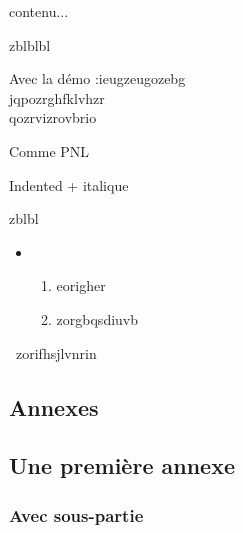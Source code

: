 \begin{lemme}
	contenu...
\end{lemme}


\begin{theoreme}
	zblblbl
\end{theoreme}


\begin{corollaire}
	Avec la démo :ieugzeugozebg \\
	jqpozrghfklvhzr \\ 
	qozrvizrovbrio
\end{corollaire}

\begin{demo}
Comme PNL
\end{demo}



\begin{remarque}
	Indented + italique
\end{remarque}



\begin{exercice}
	zblbl
	\begin{itemize}
		\item \begin{enumerate}
			\item eorigher
			\item zorgbqsdiuvb
		\end{enumerate}
	\end{itemize}
	\textperiodcentered\ zorifhsjlvnrin
\end{exercice}


\begin{annexe}
	\section{Annexes}

	\subsection{Une première annexe}
	
	\subsubsection{Avec sous-partie}
\end{annexe}



\newpage

\listoffigures
\vfill
\lstlistoflistings
\vfill

\newpage

{}

